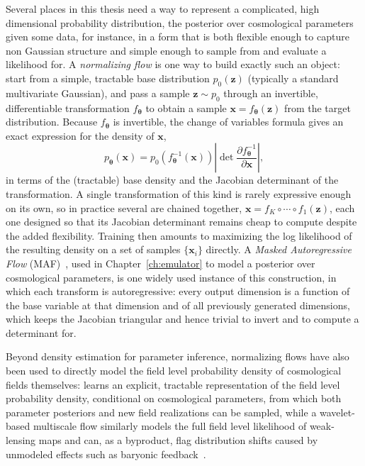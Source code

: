 Several places in this thesis need a way to represent a complicated, high dimensional probability distribution, the posterior over cosmological parameters given some data, for instance, in a form that is both flexible enough to capture non Gaussian structure and simple enough to sample from and evaluate a likelihood for. A \emph{normalizing flow} is one way to build exactly such an object: start from a simple, tractable base distribution $p_0(\bm{z})$ (typically a standard multivariate Gaussian), and pass a sample $\bm{z}\sim p_0$ through an invertible, differentiable transformation $f_{\bm\theta}$ to obtain a sample $\bm{x} = f_{\bm\theta}(\bm{z})$ from the target distribution. Because $f_{\bm\theta}$ is invertible, the change of variables formula gives an exact expression for the density of $\bm{x}$,
\begin{equation}
    p_{\bm\theta}(\bm{x}) = p_0\!\left(f_{\bm\theta}^{-1}(\bm{x})\right)\left|\det \frac{\partial f_{\bm\theta}^{-1}}{\partial \bm{x}}\right|,
\end{equation}
in terms of the (tractable) base density and the Jacobian determinant of the transformation. A single transformation of this kind is rarely expressive enough on its own, so in practice several are chained together, $\bm{x} = f_K\circ\cdots\circ f_1(\bm{z})$, each one designed so that its Jacobian determinant remains cheap to compute despite the added flexibility. Training then amounts to maximizing the log likelihood of the resulting density on a set of samples $\{\bm{x}_i\}$ directly. A \emph{Masked Autoregressive Flow} (MAF)~\citep{papamakarios_masked_2018}, used in Chapter~\ref{ch:emulator} to model a posterior over cosmological parameters, is one widely used instance of this construction, in which each transform is autoregressive: every output dimension is a function of the base variable at that dimension and of all previously generated dimensions, which keeps the Jacobian triangular and hence trivial to invert and to compute a determinant for.

Beyond density estimation for parameter inference, normalizing flows have also been used to directly model the field level probability density of cosmological fields themselves: \citet{rouhiainen2021normalizingflowsrandomfields} learns an explicit, tractable representation of the field level probability density, conditional on cosmological parameters, from which both parameter posteriors and new field realizations can be sampled, while a wavelet-based multiscale flow similarly models the full field level likelihood of weak-lensing maps and can, as a byproduct, flag distribution shifts caused by unmodeled effects such as baryonic feedback~\citep{dai_multiscale_2024}.

